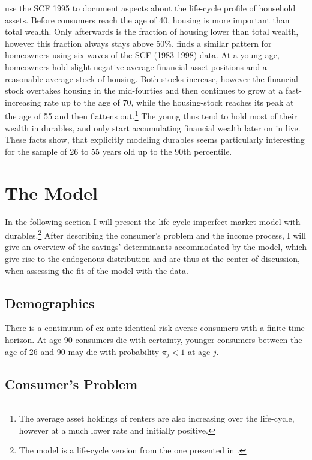 \documentclass[12pt,a4paper,leqno]{article}
\theoremstyle{definition}
\begin{document}
\cite{FV&K2011} use the SCF 1995 to document aspects about the life-cycle profile of household assets. Before consumers reach the age of 40, housing is more important than total wealth. Only afterwards is the fraction of housing lower than total wealth, however this fraction always stays above 50\%. \citep{yang2009} finds a similar pattern for  homeowners using six waves of the SCF (1983-1998) data. At a young age,  homeowners hold slight negative average financial asset positions and a reasonable average stock of housing. Both stocks increase, however the financial stock overtakes housing in the mid-fourties and then continues to grow at a fast-increasing rate up to the age of 70, while the housing-stock reaches its peak at the age of 55 and then flattens out.\footnote{The average asset holdings of renters are also increasing over the life-cycle, however at a much lower rate and initially positive.} The young thus tend to hold most of their wealth in durables, and only start accumulating financial wealth later on in live.
\\ These facts show, that explicitly modeling durables seems particularly interesting for the sample of 26 to 55 years old up to the 90th percentile.

\section{The Model}
\label{model}
In the following section I will present the life-cycle imperfect market model with durables.\footnote{The model is a life-cycle version from the one presented in \cite{hintermaier2010}.} After describing the consumer's problem and the income process, I will give an overview  of the savings' determinants accommodated by the model, which give rise to the endogenous distribution and are thus at the center of discussion, when assessing the fit of the model with the data.

\subsection{Demographics}
There is a continuum of ex ante identical risk averse consumers with a finite time horizon. At age 90 consumers die with certainty, younger consumers between the age of 26 and 90 may die with probability $\pi_{j} < 1$ at age $j$.
\subsection{Consumer's Problem} 
\end{document}
